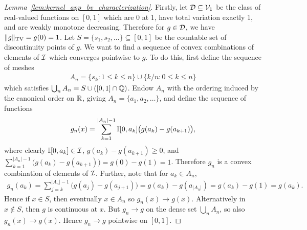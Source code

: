 \begin{proof}[Lemma~\ref{lem:kernel_app_bv_characterization}]

  Firstly, let $\mathcal{D} \subseteq \mathcal{V}_1$
  be the class of real-valued functions
  on $[0,1]$
  which are
  0 at 1,
  have total variation exactly 1,
  and are weakly monotone decreasing.
  Therefore for $g \in \mathcal{D}$,
  we have
  $\|g\|_{\mathrm{TV}} = g(0) = 1$.
  Let $S = \{s_1, s_2, \dots\} \subseteq [0,1]$
  be the countable set of discontinuity points of $g$.
  We want to find a sequence of
  convex combinations of elements of
  $\mathcal{I}$ which converges pointwise to $g$.
  To do this, first define the sequence of meshes
  \begin{align*}
    A_n =
    \{s_k : 1 \leq k \leq n\}
    \cup
    \{k/n : 0 \leq k \leq n\}
  \end{align*}
  which satisfies
  $\bigcup_n A_n = S \cup ([0,1] \cap \mathbb{Q})$.
  Endow $A_n$ with the ordering
  induced by the canonical order on $\mathbb{R}$,
  giving $A_n = \{a_1, a_2, \ldots\}$,
  and define the sequence of functions
  \begin{align*}
    g_n(x)
    = \sum_{k = 1}^{|A_n|-1}
    \mathbb{I}[0,a_k]
    \big( g(a_k) - g(a_{k+1}) \big),
  \end{align*}
  where clearly
  $\mathbb{I}[0, a_k] \in \mathcal{I}$,
  $g(a_k) - g(a_{k+1}) \geq 0$,
  and
  $\sum_{k = 1}^{|A_n|-1}
  \big(
    g(a_k) - g(a_{k+1})
  \big)
  = g(0) - g(1) = 1$.
  Therefore
  $g_n$ is a convex combination of elements of
  $\mathcal{I}$.
  Further, note that for
  $a_k \in A_n$,
  \begin{align*}
    g_n(a_k)
    = \sum_{j = k}^{|A_n|-1}
    \big( g(a_j) - g(a_{j+1}) \big)
    = g(a_k) - g(a_{|A_n|})
    = g(a_k) - g(1)
    = g(a_k).
  \end{align*}
  Hence if $x \in S$,
  then eventually $x \in A_n$
  so $g_n(x) \to g(x)$.
  Alternatively in $x \not\in S$,
  then $g$ is continuous at $x$.
  But $g_n \to g$ on the dense set $\bigcup_n A_n$,
  so also $g_n(x) \to g(x)$.
  Hence $g_n \to g$
  pointwise on $[0,1]$.


\end{proof}
